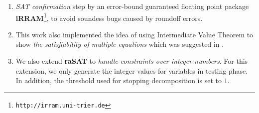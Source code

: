 \begin{enumerate}
\begin{comment}
\end{comment}
\item \emph{SAT confirmation} step by an error-bound guaranteed floating point package {\bf iRRAM}\footnote{%
\tt http://irram.uni-trier.de}, to avoid soundess bugs caused by roundoff errors.
\item This work also implemented the idea of using Intermediate Value Theorem to show \emph{the satisfiability of multiple equations} which was suggested in \cite{VanKhanh201227}.
\item We also extend \textbf{raSAT} to \emph{handle constraints over integer numbers}. For this extension, we only generate the integer values for variables in testing phase. In addition, the threshold used for stopping decomposition is set to $1$.
\end{enumerate}
\begin{comment}
\subsection{Inequalities}
Constraints with inequalities can be categorized into four cases:
\begin{enumerate}
\item \textbf{SAT with without touching}
\begin{figure}[ht]
\centering
\texttt{[image: SAT-withoutTouching.png]} 
\caption{SAT without touching dectected by ICP} 
\label{fig:sat-withoutTouching} 
\end{figure} 

\item \textbf{SAT/UNSAT with touching/convergence}
\begin{figure}[ht]
\centering
\texttt{[image: SAT-touching.png]} 
\caption{SAT(UNSAT) detected by Grobner basis method} 
\label{fig:sat-touching} 
\end{figure} 

\item \textbf{UNSAT without touching/convergence}
\begin{figure}[ht]
\centering
\texttt{[image: UNSAT-withoutTouching.png]} 
\caption{UNSAT detected by ICP} 
\label{fig:unsat-withoutTouching} 
\end{figure} 
\end{enumerate}
\end{comment}
